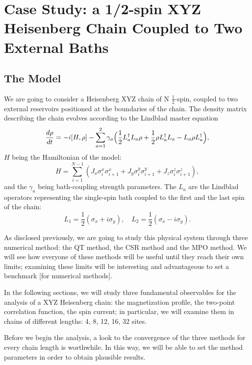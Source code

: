\chapter{Case Study: a 1/2-spin XYZ Heisenberg Chain Coupled to Two External Baths}
\label{Chapter3}

\section{The Model}
We are going to consider a Heisenberg XYZ chain of N $\frac{1}{2}$-spin, coupled to two external reservoirs positioned at the boundaries of the chain. The density matrix describing the chain evolves according to the Lindblad master equation
\begin{equation}
    \frac{d\rho}{dt} = -i[H, \rho] - \sum_{a=1}^{2}\gamma_a\Bigl(\frac{1}{2}L_a^{\dagger}L_a\rho + \frac{1}{2}\rho L_a^{\dagger}L_a - L_a\rho L_a^{\dagger}\Bigl),
\end{equation}
$H$ being the Hamiltonian of the model:
\begin{equation}
\label{ham_chain}
    H = \sum_{i = 1}^{N-1} (J_x \sigma_i^x \sigma_{i+1}^x + J_y \sigma_i^y \sigma_{i+1}^y + J_z \sigma_i^z \sigma_{i+1}^z),
\end{equation}
and the $\gamma_a$ being bath-coupling strength parameters. The $L_a$ are the Lindblad operators representing the single-spin bath coupled to the first and the last spin of the chain:
\begin{equation}
    L_1 = \frac{1}{2}(\sigma_x + i\sigma_y), \quad L_2 = \frac{1}{2}(\sigma_x - i\sigma_y).
\end{equation}

As disclosed previously, we are going to study this physical system through three numerical method: the QT method, the CSR method and the MPO method. We will see how everyone of these methods will be useful until they reach their own limits; examining these limits will be interesting and advantageous to set a benchmark [for numerical methods].

In the following sections, we will study three fundamental observables for the analysis of a XYZ Heisenberg chain: the magnetization profile, the two-point correlation function, the spin current; in particular, we will examine them in chains of different lengths: 4, 8, 12, 16, 32 sites. 

Before we begin the analysis, a look to the convergence of the three methods for every chain length is worthwhile. In this way, we will be able to set the method parameters in order to obtain  plausible results.

